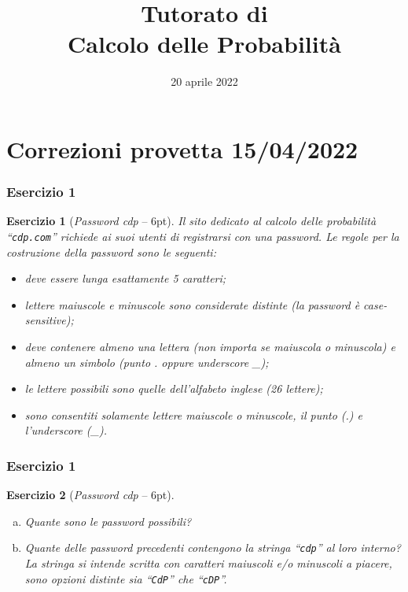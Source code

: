 \documentclass{beamer}
\title[Tutorato Probabilità]
{Tutorato di\\Calcolo delle Probabilità}
\author[DISI]{%
	\texorpdfstring{%
		\begin{columns}
			\column{.50\linewidth}
			\centering
			Camilla Righetti
			\column{.50\linewidth}
			\centering
			Matteo Franzil
		\end{columns}
	}{DISI}
}
\institute[UniTN]{
	\texorpdfstring{%
		\texttt{[image: drawable/logos/logo-disi.png]}
	}{University of Trento}\\
	\smallskip
	Corso di Laurea in Ingegneria Informatica, delle Comunicazioni ed Elettronica
}
\date[06/04/2022]{20 aprile 2022}
\newtheorem{exercise}{Esercizio}
\begin{document}
\frame{\titlepage}

\section{Correzioni provetta 15/04/2022}

\def\pointsQa{6}
\def\pointsQb{6}
\def\pointsQc{8}
\def\pointsQd{8}
\def\pointsQe{5}

\begin{frame}[fragile]
	\frametitle{Esercizio 1}

	\begin{exercise}[\textit{Password cdp} -- \pointsQa pt]
		Il sito dedicato al calcolo delle probabilit\`a ``\texttt{cdp.com}'' richiede ai suoi utenti di registrarsi con una password. Le regole per la costruzione della password sono le seguenti:

		\begin{itemize}[-]
			\item deve essere lunga esattamente 5 caratteri;
			\item lettere maiuscole e minuscole sono considerate distinte (la password è case-sensitive);
			\item deve contenere almeno una lettera (non importa se maiuscola o minuscola) e almeno un simbolo (punto . oppure underscore \_);
			\item le lettere possibili sono quelle dell'alfabeto inglese (26 lettere);
			\item sono consentiti solamente lettere maiuscole o minuscole, il punto (.) e l'underscore (\_).
		\end{itemize}
	\end{exercise}
\end{frame}

\begin{frame}[fragile]
	\frametitle{Esercizio 1}

	\begin{exercise}[\textit{Password cdp} -- \pointsQa pt]

		\begin{enumerate}[(a)]
			\item Quante sono le password possibili?
			\item Quante delle password precedenti contengono la stringa ``\texttt{cdp}'' al loro interno? La stringa si intende scritta con caratteri maiuscoli e/o minuscoli a piacere, sono opzioni distinte sia ``\texttt{CdP}'' che ``\texttt{cDP}''.
		\end{enumerate}
	\end{exercise}
\end{frame}
\end{document}
